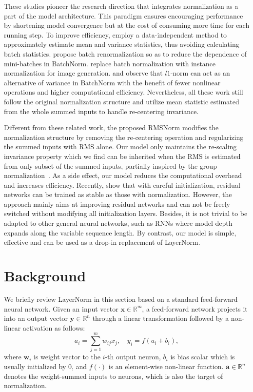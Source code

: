 \documentclass{article}
\begin{document}
These studies pioneer the research direction that integrates normalization as a part of the model architecture. This paradigm ensures encouraging performance by shortening model convergence but at the cost of consuming more time for each running step. To improve efficiency, \citet{arpit2016normalization} employ a data-independent method to approximately estimate mean and variance statistics, thus avoiding calculating batch statistics. \citet{ioffe2017batch} propose batch renormalization so as to reduce the dependence of mini-batches in BatchNorm. \citet{DBLP:journals/corr/UlyanovVL16} replace batch normalization with instance normalization for image generation. \citet{hoffer2018norm} and \citet{wu2018l1} observe that $l1$-norm can act as an alternative of variance in BatchNorm with the benefit of fewer nonlinear operations and higher computational efficiency. Nevertheless, all these work still follow the original normalization structure and utilize mean statistic estimated from the whole summed inputs to handle re-centering invariance.

Different from these related work, the proposed RMSNorm modifies the normalization structure by removing the re-centering operation and regularizing the summed inputs with RMS alone. Our model only maintains the re-scaling invariance property which we find can be inherited when the RMS is estimated from only subset of the summed inputs, partially inspired by the group normalization~\cite{wu2018group}. As a side effect, our model reduces the computational overhead and increases efficiency. Recently, \citet{zhang2018residual} show that with careful initialization, residual networks can be trained as stable as those with normalization. However, the approach mainly aims at improving residual networks and can not be freely switched without modifying all initialization layers. Besides, it is not trivial to be adapted to other general neural networks, such as RNNs where model depth expands along the variable sequence length. By contrast, our model is simple, effective and can be used as a drop-in replacement of LayerNorm.

\section{Background}

We briefly review LayerNorm in this section based on a standard feed-forward neural network. Given an input vector $\mathbf{x}\in\mathbb{R}^{m}$, a feed-forward network projects it into an output vector $\mathbf{y}\in\mathbb{R}^{n}$ through a linear transformation followed by a non-linear activation as follows:
\begin{equation}
    a_i = \sum_{j=1}^m{w_{ij} x_j},\quad y_i = f\left(a_i + b_i\right),
\end{equation}
where $\mathbf{w}_i$ is weight vector to the $i$-th output neuron, $b_i$ is bias scalar which is usually initialized by 0, and $f(\cdot)$ is an element-wise non-linear function. $\mathbf{a} \in \mathbb{R}^n$ denotes the weight-summed inputs to neurons, which is also the target of normalization.
\end{document}
